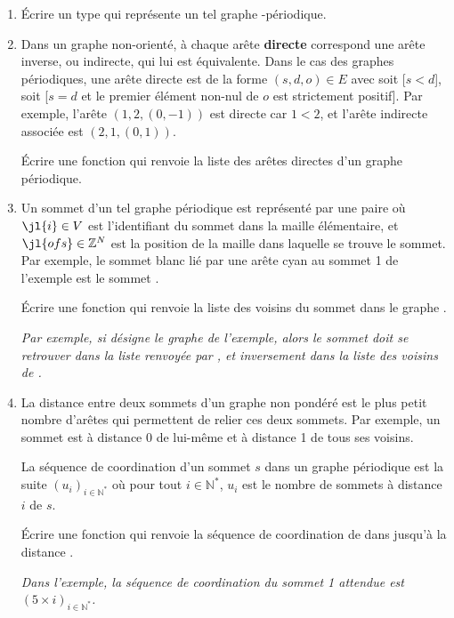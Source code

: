 \documentclass{article}
\newcommand{\paren}[1]{\ensuremath{\left(#1\right)}}
\newcommand{\seq}[3]{\ensuremath{\left(#1_{#2}\right)_{#2\in#3}}}
\newcommand{\N}{\mathbb{N}}
\newcommand{\Z}{\mathbb{Z}}
\begin{document}
\begin{enumerate}
	\item Écrire un type  qui représente un tel graphe -périodique.
	
	\item Dans un graphe non-orienté, à chaque arête \textbf{directe} correspond une arête inverse, ou indirecte, qui lui est équivalente. Dans le cas des graphes périodiques, une arête directe est de la forme $(s, d, o)\in E$ avec soit  [$s < d$], soit [$s = d$ et le premier élément non-nul de $o$ est strictement positif]. Par exemple, l'arête $(1, 2, (0, -1))$ est directe car $1 < 2$, et l'arête indirecte associée est $(2, 1, (0, 1))$.

	Écrire une fonction  qui renvoie la liste des arêtes directes d'un graphe périodique.

	\item Un sommet d'un tel graphe périodique est représenté par une paire  où $\jl{i}\in V$ est l'identifiant du sommet dans la maille élémentaire, et $\jl{ofs}\in\Z^N$ est la position de la maille dans laquelle se trouve le sommet. Par exemple, le sommet blanc lié par une arête cyan au sommet 1 de l'exemple est le sommet .

	Écrire une fonction  qui renvoie la liste des voisins du sommet  dans le graphe .

	\textsl{Par exemple, si  désigne le graphe de l'exemple, alors le sommet  doit se retrouver dans la liste renvoyée par , et inversement  dans la liste des voisins de .}
	
	\item La distance entre deux sommets d'un graphe non pondéré est le plus petit nombre d'arêtes qui permettent de relier ces deux sommets. Par exemple, un sommet est à distance 0 de lui-même et à distance 1 de tous ses voisins.

	La séquence de coordination d'un sommet $s$ dans un graphe périodique est la suite $\seq ui{\N^*}$ où pour tout $i\in\N^*$, $u_i$ est le nombre de sommets à distance $i$ de $s$.
	
	Écrire une fonction  qui renvoie la séquence de coordination de  dans  jusqu'à la distance .
	
	\textit{Dans l'exemple, la séquence de coordination du sommet 1 attendue est $\paren{5\times i}_{i \in\N^*}$.}
\end{enumerate}
\end{document}
